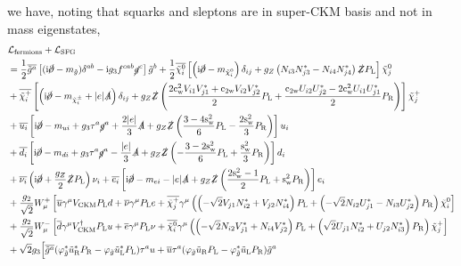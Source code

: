 \documentclass[CheatSheet]{subfiles}
\begin{document}
we have, noting that squarks and sleptons are in super-CKM basis and not in mass eigenstates,
\begin{align}
&  \mathcal L\w{fermions} + \mathcal L\w{SFG}
\notag\\&=
\frac{1}{2}
 \overline{\tig^a}\left[(\ii\cancel{\partial}-m_{\tilde g})\delta^{ab}-{\ii} g_3 f^{cab}\cancel{g}^c
\right]\tig^b
+ \frac{1}{2}  \overline{\neut[i]}\left[\left(\ii\cancel{\partial}-m_{\neut[i]}\right)\delta_{ij}
+ g_Z\left(N_{i3} N_{j3}^*-N_{i4} N_{j4}^*\right)\slashed{Z}\PL
\right]\neut[j]
\notag\\&
+ \overline{\charP[i]}\left[
\left(\ii\cancel{\partial}-m_{\charPM[i]}
  + |e|\slashed{A}\right)\delta_{ij}
  + g_Z \slashed{Z}\left(\frac{2\cw^2 V_{i1} V_{j1}^*+\co{2\mathrm w}V_{i2} V_{j2}^*}{2}\PL
  + \frac{\co{2\mathrm w}U_{i2} U_{j2}^* -2\cw^2 U_{i1} U_{j1}^*}{2}\PR\right)
\right]\charP[j]
%
\notag\\&
%
 + \overline{u_i}\left[\ii\cancel{\partial}-m_{ui}+g_3\tau^a \cancel{g}^a+\frac{2|e|}{3}\slashed{A}
+g_Z\slashed{Z}\left(\frac{3-4\sw^2}{6}\PL-\frac{2\sw^2}{3}\PR\right)
\right]u_i
\notag\\&
%
 + \overline{d_i}\left[\ii\cancel{\partial}-m_{di}+g_3\tau^a \cancel{g}^a-\frac{|e|}{3}\slashed{A}
+g_Z\slashed{Z}\left(-\frac{3-2\sw^2}{6}\PL+\frac{\sw^2}{3}\PR\right)
\right]d_i
\notag\\&
 + \overline{\nu_i}\left(\ii\cancel{\partial}  +\frac{g_Z}2\slashed{Z}\PL\right)\nu_i
 + \overline{e_i}\left[\ii\cancel{\partial}-m_{ei}-|e|\slashed{A}
+g_Z\slashed{Z}\left(\frac{2\sw^2-1}{2}\PL+\sw^2\PR\right)\right]e_i
\notag\\&+\frac{g_2}{\sqrt2}W_\mu^+\left[
    \overline{u}\gamma^\mu V\w{CKM}\PL d
    +\overline{\nu}\gamma^\mu\PL e
    + \overline{\charP[j]}\gamma^\mu\left(
     \left(-\sqrt{2}V_{j1} N_{i2}^*+{V_{j2} N_{i4}^*}\right) \PL
    +\left(-\sqrt2 N_{i2} U_{j1}^*-N_{i3} U_{j2}^*\right)\PR
    \right)\neut[i]
\right]
\notag\\&+\frac{g_2}{\sqrt2}W_\mu^-\left[
    \overline{d}\gamma^\mu V\w{CKM}^\dagger \PL u
    +\overline{e}\gamma^\mu\PL\nu
    +\overline{\neut[i]}\gamma^\mu\left(
       \left(-\sqrt2 N_{i2} V_{j1}^*+N_{i4} V_{j2}^*\right) \PL
      +\left(\sqrt{2}U_{j1} N_{i2}^*+{U_{j2} N_{i3}^*}\right) \PR
    \right)\charP[j]
\right]
\notag\\&
 +\sqrt{2} g_3\Bigl[
   \overline{\tig^a}(\varphi^*_{\tilde g} \tuR^{*}\PR -\varphi_{\tilde g}\tuL^{*}\PL) \tau^{a}u
 + \overline{u}\tau^a(\varphi_{\tilde g}\tuR\PL-\varphi^*_{\tilde g}\tuL\PR) \tig^a

\end{align}
\end{document}
